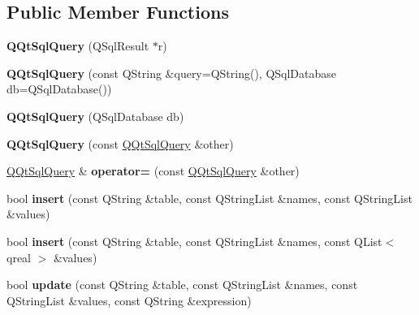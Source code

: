 \subsection*{Public Member Functions}
\begin{DoxyCompactItemize}
\item 
\mbox{\label{class_q_qt_sql_query_a72ab805b69e05040c9d3388e401938bc}} 
{\bfseries Q\+Qt\+Sql\+Query} (Q\+Sql\+Result $\ast$r)
\item 
\mbox{\label{class_q_qt_sql_query_a3dc3d191ed9de0182d32b5afdc9b6aa5}} 
{\bfseries Q\+Qt\+Sql\+Query} (const Q\+String \&query=Q\+String(), Q\+Sql\+Database db=Q\+Sql\+Database())
\item 
\mbox{\label{class_q_qt_sql_query_aa28a90827886e22bb16ede60ba03005c}} 
{\bfseries Q\+Qt\+Sql\+Query} (Q\+Sql\+Database db)
\item 
\mbox{\label{class_q_qt_sql_query_a5cc0ac8834659c6390eeb33ea3370207}} 
{\bfseries Q\+Qt\+Sql\+Query} (const \mbox{\hyperlink{class_q_qt_sql_query}{Q\+Qt\+Sql\+Query}} \&other)
\item 
\mbox{\label{class_q_qt_sql_query_a94068e29e8d5bdff702b7ba9ec0c62d8}} 
\mbox{\hyperlink{class_q_qt_sql_query}{Q\+Qt\+Sql\+Query}} \& {\bfseries operator=} (const \mbox{\hyperlink{class_q_qt_sql_query}{Q\+Qt\+Sql\+Query}} \&other)
\item 
\mbox{\label{class_q_qt_sql_query_ae054bebaedf16242f559f6118dc3f802}} 
bool {\bfseries insert} (const Q\+String \&table, const Q\+String\+List \&names, const Q\+String\+List \&values)
\item 
\mbox{\label{class_q_qt_sql_query_a64404d923257b418052cc6718dbef9fb}} 
bool {\bfseries insert} (const Q\+String \&table, const Q\+String\+List \&names, const Q\+List$<$ qreal $>$ \&values)
\item 
\mbox{\label{class_q_qt_sql_query_a36c5910dc992815d1fac1f94d5817098}} 
bool {\bfseries update} (const Q\+String \&table, const Q\+String\+List \&names, const Q\+String\+List \&values, const Q\+String \&expression)

\end{DoxyCompactItemize}
